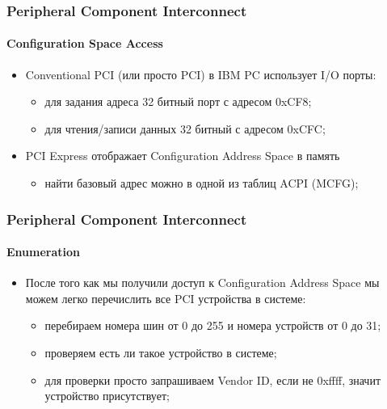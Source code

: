 \begin{frame}
\frametitle{Peripheral Component Interconnect}
\framesubtitle{Configuration Space Access}
\begin{itemize}
  \item<1-> Conventional PCI (или просто PCI) в IBM PC использует I/O порты:
    \begin{itemize}
      \item для задания адреса 32 битный порт с адресом 0xCF8;
      \item для чтения/записи данных 32 битный с адресом 0xCFC; 
    \end{itemize}
  \item<2-> PCI Express отображает Configuration Address Space в память
    \begin{itemize}
      \item найти базовый адрес можно в одной из таблиц ACPI (MCFG);
    \end{itemize}
\end{itemize}
\end{frame}

\begin{frame}
\frametitle{Peripheral Component Interconnect}
\framesubtitle{Enumeration}
\begin{itemize}
  \item После того как мы получили доступ к Configuration Address Space мы можем
        легко перечислить все PCI устройства в системе:
    \begin{itemize}
      \item перебираем номера шин от 0 до 255 и номера устройств от 0 до 31;
      \item проверяем есть ли такое устройство в системе;
      \item для проверки просто запрашиваем Vendor ID, если не 0xffff, значит
            устройство присутствует;
    \end{itemize}
\end{itemize}
\end{frame}
